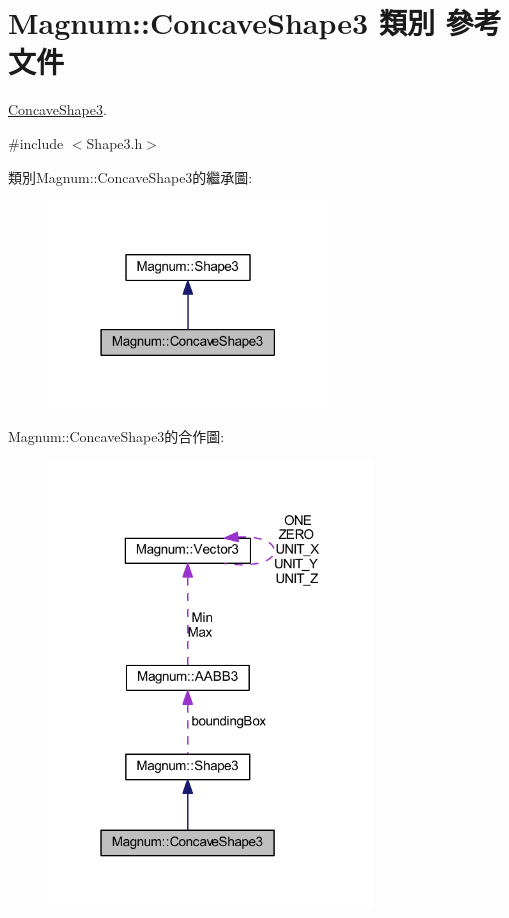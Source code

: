\hypertarget{class_magnum_1_1_concave_shape3}{}\section{Magnum\+:\+:Concave\+Shape3 類別 參考文件}
\label{class_magnum_1_1_concave_shape3}


\hyperlink{class_magnum_1_1_concave_shape3}{Concave\+Shape3}.  




{\ttfamily \#include $<$Shape3.\+h$>$}



類別\+Magnum\+:\+:Concave\+Shape3的繼承圖\+:\nopagebreak
\begin{figure}[H]
\begin{center}
\leavevmode
\includegraphics[width=210pt]{class_magnum_1_1_concave_shape3__inherit__graph}
\end{center}
\end{figure}


Magnum\+:\+:Concave\+Shape3的合作圖\+:\nopagebreak
\begin{figure}[H]
\begin{center}
\leavevmode
\includegraphics[width=244pt]{class_magnum_1_1_concave_shape3__coll__graph}
\end{center}
\end{figure}
